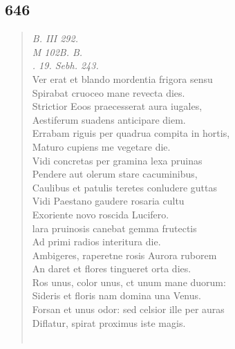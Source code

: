 \documentclass[11pt, a4paper]{report}
\begin{document}
            \subsection*{646}
      \begin{verse}
      \textit{B. III 292.} \\ \textit{M 102B. B.} \\ \textit{. 19. Sebh. 243.} \\ Ver erat et blando mordentia frigora sensu \\ Spirabat cruoceo mane revecta dies. \\ Strictior Eoos praecesserat aura iugales, \\ Aestiferum suadens anticipare diem. \\ Errabam riguis per quadrua compita in hortis, \\ Maturo cupiens me vegetare die. \\ Vidi concretas per gramina lexa pruinas \\ Pendere aut olerum stare cacuminibus, \\ Caulibus et patulis teretes conludere guttas \\ Vidi Paestano gaudere rosaria cultu \\ Exoriente novo roscida Lucifero. \\ lara pruinosis canebat gemma frutectis \\ Ad primi radios interitura die. \\ Ambigeres, raperetne rosis Aurora ruborem \\ An daret et flores tingueret orta dies. \\ Ros unus, color unus, ct unum mane duorum: \\ Sideris et floris nam domina una Venus. \\ Forsan et unus odor: sed celsior ille per auras \\ Diflatur, spirat proximus iste magis. \\ 
        ﻿\pagebreak 

\end{verse}
\end{document}

